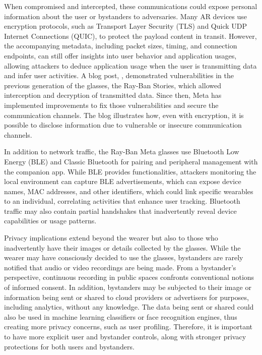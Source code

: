 When compromised and intercepted, these communications could expose personal information about the user or bystanders to adversaries. Many AR devices use encryption protocols, such as Transport Layer Security (TLS) and Quick UDP Internet Connections (QUIC), to protect the payload content in transit. However, the accompanying metadata, including packet sizes, timing, and connection endpoints, can still offer insights into user behavior and application usages, allowing attackers to deduce application usage when the user is transmitting data and infer user activities. A blog post, \citet{CodeByter2023}, demonstrated vulnerabilities in the previous generation of the glasses, the Ray-Ban Stories, which allowed interception and decryption of transmitted data. Since then, Meta has implemented improvements to fix those vulnerabilities and secure the communication channels. The blog illustrates how, even with encryption, it is possible to disclose information due to vulnerable or insecure communication channels.

In addition to network traffic, the Ray-Ban Meta glasses use Bluetooth Low Energy (BLE) and Classic Bluetooth for pairing and peripheral management with the companion app. While BLE provides functionalities, attackers monitoring the local environment can capture BLE advertisements, which can expose device names, MAC addresses, and other identifiers, which could link specific wearables to an individual, correlating activities that enhance user tracking. Bluetooth traffic may also contain partial handshakes that inadvertently reveal device capabilities or usage patterns.

Privacy implications extend beyond the wearer but also to those who inadvertently have their images or details collected by the glasses. While the wearer may have consciously decided to use the glasses, bystanders are rarely notified that audio or video recordings are being made. From a bystander's perspective, continuous recording in public spaces confronts conventional notions of informed consent. In addition, bystanders may be subjected to their image or information being sent or shared to cloud providers or advertisers for purposes, including analytics, without any knowledge. The data being sent or shared could also be used in machine learning classifiers or face recognition engines, thus creating more privacy concerns, such as user profiling. Therefore, it is important to have more explicit user and bystander controls, along with stronger privacy protections for both users and bystanders.

